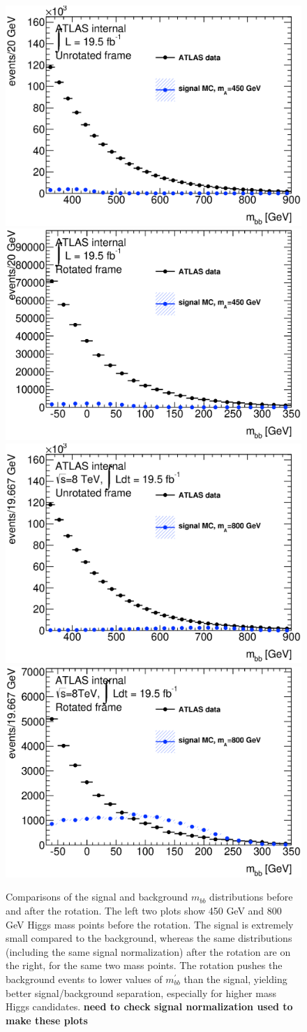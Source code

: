 \begin{figure}[hbt]
\includegraphics[width=0.45\linewidth]{SignalKin/h_mass_bAbb_450_unrotated.eps}
\includegraphics[width=0.45\linewidth]{SignalKin/h_mass_bAbb_450_rotated.eps} \\
\includegraphics[width=0.45\linewidth]{SignalKin/h_mass_bAbb_800_unrotated.eps}
\includegraphics[width=0.45\linewidth]{SignalKin/h_mass_bAbb_800_rotated.eps} \\
\caption{ Comparisons of the signal and background $m_{bb}$ distributions
    before and after the rotation.  The left two plots show 450 GeV and 800 GeV
    Higgs mass points before the rotation. The signal is extremely small compared to the background, whereas the 
    same distributions (including the same signal normalization) after the rotation
    are on the right, for the same two mass points.  The rotation pushes the
    background events to lower values of $m_{bb}^{'}$ than the signal, yielding
    better signal/background separation, especially for higher mass Higgs candidates.
    \textbf{need to check signal normalization used to make these plots}
     \label{fig:transformed_vars}}
\end{figure}

